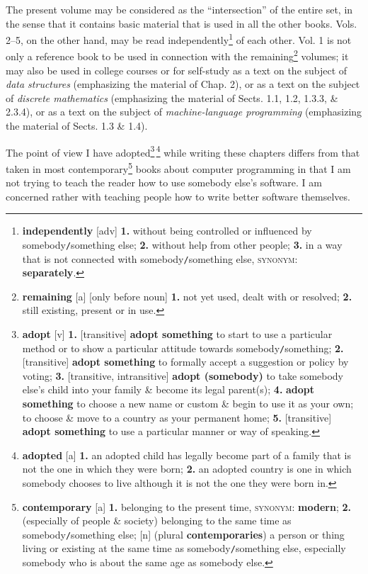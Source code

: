 \documentclass[oneside]{book}
\numberwithin{equation}{section}
\begin{document}
The present volume may be considered as the ``intersection'' of the entire set, in the sense that it contains basic material that is used in all the other books. Vols. 2--5, on the other hand, may be read independently\footnote{\textbf{independently} [adv] \textbf{1.} without being controlled or influenced by somebody\texttt{/}something else; \textbf{2.} without help from other people; \textbf{3.} in a way that is not connected with somebody\texttt{/}something else, \textsc{synonym}: \textbf{separately}.} of each other. Vol. 1 is not only a reference book to be used in connection with the remaining\footnote{\textbf{remaining} [a] [only before noun] \textbf{1.} not yet used, dealt with or resolved; \textbf{2.} still existing, present or in use.} volumes; it may also be used in college courses or for self-study as a text on the subject of \textit{data structures} (emphasizing the material of Chap. 2), or as a text on the subject of \textit{discrete mathematics} (emphasizing the material of Sects. 1.1, 1.2, 1.3.3, \& 2.3.4), or as a text on the subject of \textit{machine-language programming} (emphasizing the material of Sects. 1.3 \& 1.4).

The point of view I have adopted\footnote{\textbf{adopt} [v] \textbf{1.} [transitive] \textbf{adopt something} to start to use a particular method or to show a particular attitude towards somebody\texttt{/}something; \textbf{2.} [transitive] \textbf{adopt something} to formally accept a suggestion or policy by voting; \textbf{3.} [transitive, intransitive] \textbf{adopt (somebody)} to take somebody else's child into your family \& become its legal parent(s); \textbf{4.} \textbf{adopt something} to choose a new name or custom \& begin to use it as your own; to choose \& move to a country as your permanent home; \textbf{5.} [transitive] \textbf{adopt something} to use a particular manner or way of speaking.}\,\footnote{\textbf{adopted} [a] \textbf{1.} an adopted child has legally become part of a family that is not the one in which they were born; \textbf{2.} an adopted country is one in which somebody chooses to live although it is not the one they were born in.} while writing these chapters differs from that taken in most contemporary\footnote{\textbf{contemporary} [a] \textbf{1.} belonging to the present time, \textsc{synonym}: \textbf{modern}; \textbf{2.} (especially of people \& society) belonging to the same time as somebody\texttt{/}something else; [n] (plural \textbf{contemporaries}) a person or thing living or existing at the same time as somebody\texttt{/}something else, especially somebody who is about the same age as somebody else.} books about computer programming in that I am not trying to teach the reader how to use somebody else's software. I am concerned rather with teaching people how to write better software themselves.
\end{document}
